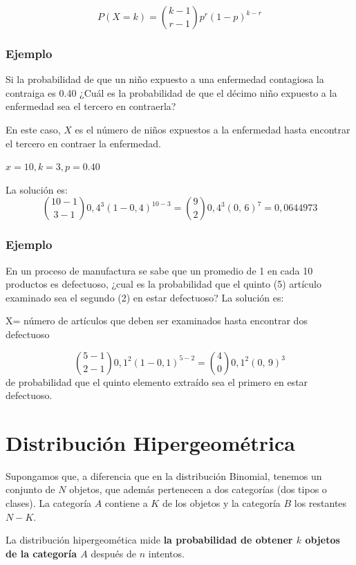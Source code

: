 \documentclass[]{book}
\theoremstyle{plain}
\theoremstyle{definition}
\theoremstyle{definition} %
\begin{document}
\[P(X=k) = {k-1 \choose r-1} p^r (1-p)^{k-r}\]

\hypertarget{ejemplo-4}{%
\subsubsection{Ejemplo}\label{ejemplo-4}}

Si la probabilidad de que un niño expuesto a una enfermedad contagiosa
la contraiga es 0.40 ¿Cuál es la probabilidad de que el décimo niño
expuesto a la enfermedad sea el tercero en contraerla?

En este caso, \(X\) es el número de niños expuestos a la enfermedad
hasta encontrar el tercero en contraer la enfermedad.

\(\displaystyle \!x=10,k=3,p=0.40\)

La solución es:
\[\displaystyle {10-1 \choose 3-1}0,\!4^{3}(1-0,4)^{10-3}={9 \choose 2}0,\!4^{3}(0,\,6)^{7}=0,\!0644973\]

\hypertarget{ejemplo-5}{%
\subsubsection{Ejemplo}\label{ejemplo-5}}

En un proceso de manufactura se sabe que un promedio de 1 en cada 10
productos es defectuoso, ¿cual es la probabilidad que el quinto (5)
artículo examinado sea el segundo (2) en estar defectuoso? La solución
es:

X= número de artículos que deben ser examinados hasta encontrar dos
defectuoso

\[\displaystyle {5-1 \choose 2-1}0,\!1^{2}(1-0,\!1)^{5-2}={4 \choose 0}0,\!1^{2}(0,\,9)^{3}\]
de probabilidad que el quinto elemento extraído sea el primero en estar
defectuoso.

\hypertarget{distribuciuxf3n-hipergeomuxe9trica}{%
\section{Distribución
Hipergeométrica}\label{distribuciuxf3n-hipergeomuxe9trica}}

Supongamos que, a diferencia que en la distribución Binomial, tenemos un
conjunto de \(N\) objetos, que además pertenecen a dos categorías (dos
tipos o clases). La categoría \(A\) contiene a \(K\) de los objetos y la
categoría \(B\) los restantes \(N-K\).

La distribución hipergeomética mide \textbf{la probabilidad de obtener
\(k\) objetos de la categoría \(A\)} después de \(n\) intentos.
\end{document}
